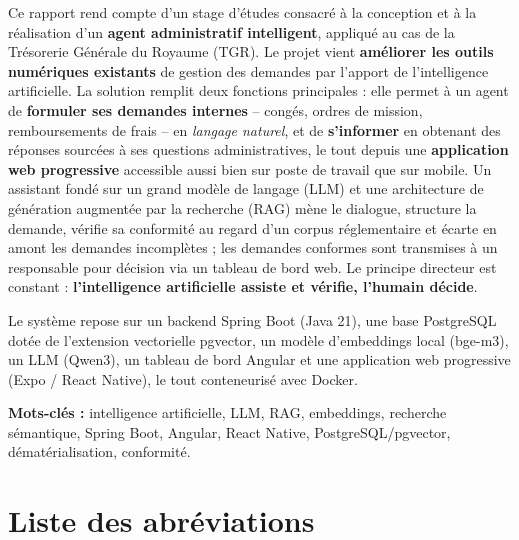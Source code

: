\documentclass[a4paper,12pt,oneside]{report}
\begin{document}
Ce rapport rend compte d'un stage d'études consacré à la conception et à la
réalisation d'un \textbf{agent administratif intelligent}, appliqué au cas de la
Trésorerie Générale du Royaume (TGR). Le projet vient \textbf{améliorer les outils
numériques existants} de gestion des demandes par l'apport de l'intelligence
artificielle. La solution remplit deux fonctions
principales : elle permet à un agent de \textbf{formuler ses demandes internes}
-- congés, ordres de mission, remboursements de frais -- en \emph{langage
naturel}, et de \textbf{s'informer} en obtenant des réponses sourcées à ses
questions administratives, le tout depuis une \textbf{application web progressive}
accessible aussi bien sur poste de travail que sur mobile. Un assistant fondé sur
un grand modèle de langage (LLM) et une architecture de génération augmentée par
la recherche (RAG) mène le dialogue, structure la demande, vérifie sa conformité
au regard d'un corpus réglementaire et écarte en amont les demandes incomplètes ;
les demandes conformes sont transmises à un responsable pour décision via un
tableau de bord web. Le principe directeur est constant : \textbf{l'intelligence
artificielle assiste et vérifie, l'humain décide}.

Le système repose sur un backend Spring Boot (Java 21), une base PostgreSQL
dotée de l'extension vectorielle pgvector, un modèle d'embeddings local
(bge-m3), un LLM (Qwen3), un tableau de bord Angular et une application web
progressive (Expo / React Native), le tout conteneurisé avec Docker.

\medskip
\noindent\textbf{Mots-clés :} intelligence artificielle, LLM, RAG, embeddings,
recherche sémantique, Spring Boot, Angular, React Native, PostgreSQL/pgvector,
dématérialisation, conformité.

\tableofcontents

\chapter*{Liste des abréviations}
\end{document}
